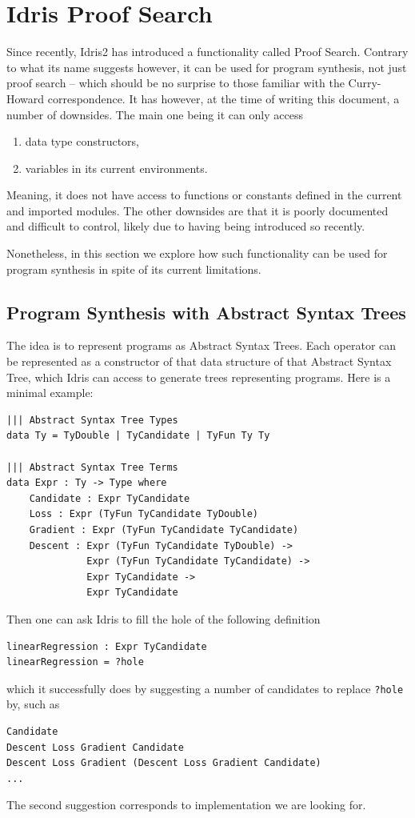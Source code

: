 \documentclass[]{report}
\begin{document}
\section{Idris Proof Search}
Since recently, Idris2 has introduced a functionality called Proof
Search.  Contrary to what its name suggests however, it can be used
for program synthesis, not just proof search -- which should be no
surprise to those familiar with the Curry-Howard correspondence.  It
has however, at the time of writing this document, a number of
downsides.  The main one being it can only access
\begin{enumerate}
\item data type constructors,
\item variables in its current environments.
\end{enumerate}
Meaning, it does not have access to functions or constants defined in
the current and imported modules.  The other downsides are that it is
poorly documented and difficult to control, likely due to having being
introduced so recently.

Nonetheless, in this section we explore how such functionality can be
used for program synthesis in spite of its current limitations.

\subsection{Program Synthesis with Abstract Syntax Trees}
\label{subsec:AST}
The idea is to represent programs as Abstract Syntax Trees.  Each
operator can be represented as a constructor of that data structure of
that Abstract Syntax Tree, which Idris can access to generate trees
representing programs.  Here is a minimal example:
\begin{verbatim}
||| Abstract Syntax Tree Types
data Ty = TyDouble | TyCandidate | TyFun Ty Ty

||| Abstract Syntax Tree Terms
data Expr : Ty -> Type where
    Candidate : Expr TyCandidate
    Loss : Expr (TyFun TyCandidate TyDouble)
    Gradient : Expr (TyFun TyCandidate TyCandidate)
    Descent : Expr (TyFun TyCandidate TyDouble) ->
              Expr (TyFun TyCandidate TyCandidate) ->
              Expr TyCandidate ->
              Expr TyCandidate
\end{verbatim}
Then one can ask Idris to fill the hole of the following definition
\begin{verbatim}
linearRegression : Expr TyCandidate
linearRegression = ?hole
\end{verbatim}
which it successfully does by suggesting a number of candidates to
replace \texttt{?hole} by, such as
\begin{verbatim}
Candidate
Descent Loss Gradient Candidate
Descent Loss Gradient (Descent Loss Gradient Candidate)
...
\end{verbatim}
The second suggestion corresponds to implementation we are looking
for.
\end{document}

